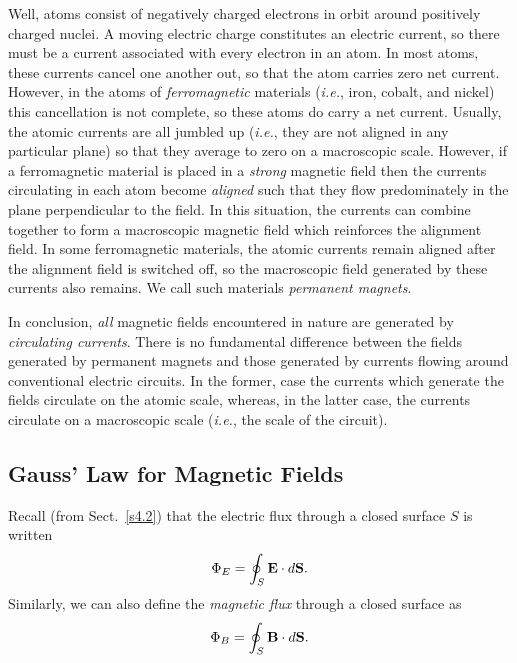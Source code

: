 Well, atoms consist of negatively charged electrons in orbit around positively
charged nuclei. A moving electric charge constitutes an electric current, so
there must be a current associated with every electron in an atom. In most
atoms, these currents cancel one another out, so that the atom carries
zero net current. However, in the atoms of {\em ferromagnetic}\/ materials
({\em i.e.}, iron, cobalt, and nickel) this cancellation is not complete,
so these atoms do carry a net current. 
Usually, the atomic currents are all jumbled up 
({\em i.e.}, they are not aligned in any particular plane)
so that they average to zero on
a
 macroscopic scale.
However, if a ferromagnetic material is
placed in a {\em strong}\/ magnetic field then the currents circulating in
each atom become {\em aligned}\/ such that they flow predominately
in the plane perpendicular to the
field. In this situation, the currents can combine together to form a
macroscopic magnetic field which reinforces the alignment field. In some
ferromagnetic materials, the atomic currents remain aligned
after the alignment field is switched off, so the macroscopic field generated by
these currents also remains. We call such materials {\em permanent magnets}. 

In conclusion, {\em all}\/ magnetic fields encountered in nature are generated by
{\em circulating currents}. There is no fundamental difference between the fields
generated by permanent magnets and those generated by currents flowing around
conventional electric circuits. In the former, case the currents which generate the
fields circulate on the atomic scale, whereas, in the latter case, the currents
circulate on a macroscopic scale ({\em i.e.}, the scale of the circuit). 

\subsection{Gauss' Law for Magnetic Fields}\label{s8.10}
Recall (from Sect.~\ref{s4.2}) that the electric flux through a closed
surface $S$ is 
written
\begin{equation}
\Phi_E = \oint_S {\bf E}\cdot d{\bf S}.
\end{equation}
Similarly, we can also define the {\em magnetic flux}\/  through a
closed surface as
\begin{equation}
\Phi_B = \oint_S {\bf B}\cdot d{\bf S}.
\end{equation}


